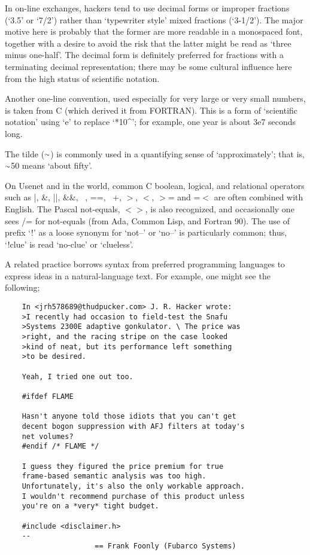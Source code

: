 In on-line exchanges, hackers tend to use decimal forms or improper fractions (`3.5' or `7/2') rather than `typewriter style' mixed
fractions (`3-1/2'). The major motive here is probably that the former are more readable in a monospaced font, together with a desire to
avoid the risk that the latter might be read as `three minus one-half'. The decimal form is definitely preferred for fractions with a
terminating decimal representation; there may be some cultural influence here from the high status of scientific notation.

Another one-line convention, used especially for very large or very small numbers, is taken from C (which derived it from FORTRAN). This is
a form of `scientific notation' using `e' to replace `*10\^{}'; for example, one year is about 3e7 seconds long.

The tilde ($\Tilde$) is commonly used in a quantifying sense of `approximately'; that is, $\Tilde$50 means `about fifty'.

On Usenet and in the  world, common C boolean, logical, and relational operators such as |, \&, ||, \&\&, ~, ==, ~+, $>$,
$<$, $>$= and =$<$ are often combined with English. The Pascal not-equals, $<$$>$, is also recognized, and occasionally one sees /= for
not-equals (from Ada, Common Lisp, and Fortran 90). The use of prefix `!' as a loose synonym for `not--' or `no--' is particularly common;
thus, `!clue' is read `no-clue' or `clueless'.

A related practice borrows syntax from preferred programming languages to express ideas in a natural-language text. For example, one might
see the following;

\begin{verbatim}
	In <jrh578689@thudpucker.com> J. R. Hacker wrote:
	>I recently had occasion to field-test the Snafu
	>Systems 2300E adaptive gonkulator. \ The price was
	>right, and the racing stripe on the case looked
	>kind of neat, but its performance left something
	>to be desired.

	Yeah, I tried one out too.
	
	#ifdef FLAME

	Hasn't anyone told those idiots that you can't get
	decent bogon suppression with AFJ filters at today's
	net volumes?
	#endif /* FLAME */

	I guess they figured the price premium for true
	frame-based semantic analysis was too high.
	Unfortunately, it's also the only workable approach.
	I wouldn't recommend purchase of this product unless
	you're on a *very* tight budget.

	#include <disclaimer.h>
	--
	                 == Frank Foonly (Fubarco Systems)
\end{verbatim}

